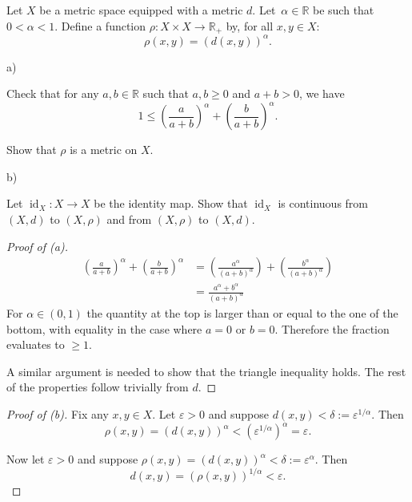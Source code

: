 \begin{prob}
    Let $X$ be a metric space equipped with a metric $d$. 
    Let $\alpha \in \mathbb R$ be such that $0 < \alpha < 1$. 
    Define a function $\rho : X\times X \to \mathbb R_+$ by, for all 
    $x,y \in X$: 
    \[
        \rho(x,y) = (d(x,y))^\alpha.
    \]

    a) 

    Check that for any $a,b \in \mathbb R$ such that 
    $a,b \geq 0$ and $a+b > 0$, we have 
    \[
        1 \leq \left(\frac{a}{a+b}\right)^\alpha 
        + \left(\frac{b}{a+b}\right)^\alpha.
    \]

    Show that $\rho$ is a metric on $X$.

    b) 

    Let $\operatorname{id}_X : X \to X$ be the identity 
    map. Show that $\operatorname{id}_X$ is continuous from 
    $(X,d)$ to $(X,\rho)$ and from $(X,\rho)$ to $(X,d)$.
\end{prob}
\begin{proof}[Proof of (a)]
    \begin{align*}
        \left(\frac{a}{a+b}\right)^\alpha 
        + \left(\frac{b}{a+b}\right)^\alpha 
        &= 
        \left(\frac{a^\alpha}{(a+b)^\alpha}\right) 
        + \left(\frac{b^\alpha}{(a+b)^\alpha}\right)
        \\ 
        &= \frac{a^\alpha + b^\alpha}{(a+b)^\alpha}
    \end{align*}
    For $\alpha \in (0,1)$ the quantity at the top is 
    larger than or equal to the one of the bottom, with 
    equality in the case where $a = 0$ or $b = 0$.
    Therefore the fraction evaluates to $\geq 1$.

    A similar argument is needed to show that the triangle 
    inequality holds. The rest of the properties follow trivially 
    from $d$.
\end{proof}
\begin{proof}[Proof of (b)]
    Fix any $x,y \in X$.
    Let $\varepsilon > 0$ and suppose $d(x,y) < \delta :=  
    \varepsilon^{1/\alpha} $.
    Then 
    \[
        \rho(x,y) = (d(x,y))^\alpha < 
        (\varepsilon^{1/\alpha})^\alpha = \varepsilon.
    \]

    Now let $\varepsilon > 0$ and suppose 
    $\rho(x,y) = (d(x,y))^\alpha < \delta := \varepsilon^{\alpha}$. 
    Then 
    \[
        d(x,y) = (\rho(x,y))^{1/\alpha} < 
        \varepsilon.
    \]
\end{proof}

